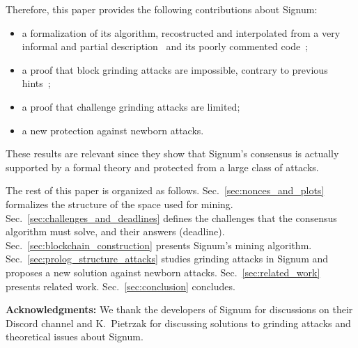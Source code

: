 Therefore, this paper provides the following contributions about Signum:
%
\begin{itemize}
\item a formalization of its algorithm, recostructed and interpolated from a very informal and partial
  description~\cite{SignumPlotting} and its poorly commented code~\cite{SignumSource};
\item a proof that block grinding attacks are impossible, contrary to previous hints~\cite{ParkKFGAP18};
\item a proof that challenge grinding attacks are limited;
\item a new protection against newborn attacks.
\end{itemize}
%
These results are relevant since they show that Signum's consensus
is actually supported by a formal theory and
protected from a large class of attacks.

The rest of this paper is organized as follows.
Sec.~\ref{sec:nonces_and_plots} formalizes the structure of the space used for mining.
Sec.~\ref{sec:challenges_and_deadlines} defines the challenges that the consensus
algorithm must solve, and their answers (deadline).
Sec.~\ref{sec:blockchain_construction} presents Signum's mining algorithm.
Sec.~\ref{sec:prolog_structure_attacks} studies grinding attacks
in Signum and proposes a new solution against newborn attacks.
Sec.~\ref{sec:related_work} presents related work.
Sec.~\ref{sec:conclusion} concludes.

\vspace*{1ex}
\textbf{Acknowledgments:}
We thank the developers of Signum for discussions on their Discord channel
and K.\ Pietrzak for discussing solutions to
grinding attacks and theoretical issues about Signum.

